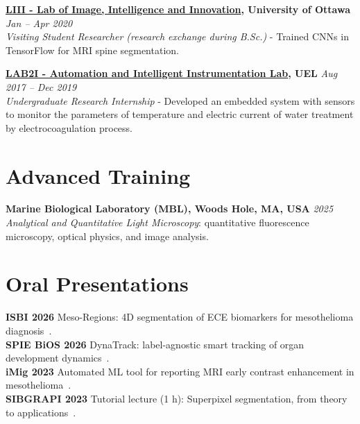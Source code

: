 \documentclass[margin,line]{resume}
\begin{document}
\begin{resume}
        \textbf{\href{https://sites.google.com/view/labiii/members/current?authuser=0}{LIII - Lab of Image, Intelligence and Innovation}, University of Ottawa} \hfill \textsl{Jan -- Apr 2020}\\
         \textit{Visiting Student Researcher (research exchange during B.Sc.)} - Trained CNNs in TensorFlow for MRI spine segmentation.
        \vspace{-0.3cm}

        \textbf{\href{https://www.linkedin.com/company/la2i---laborat-rio-de-automa-o-e-instrumenta-o-inteligente/}{LAB2I - Automation and Intelligent Instrumentation Lab}, UEL}  \hfill \textsl{Aug 2017 -- Dec 2019}\\
         \textit{Undergraduate Research Internship} - Developed an embedded system with sensors to monitor the parameters of temperature and electric current of water treatment by electrocoagulation process.

    \section{\mysidestyle Advanced Training}
    
    \textbf{Marine Biological Laboratory (MBL), Woods Hole, MA, USA} \hfill \textsl{2025}\\
    \textit{Analytical and Quantitative Light Microscopy}: quantitative fluorescence microscopy, optical physics, and image analysis.
     \vspace{-0.3cm}
      \section{\mysidestyle Oral Presentations}
        \textbf{ISBI 2026} Meso-Regions: 4D segmentation of ECE biomarkers for mesothelioma diagnosis~\cite{11515662}.\\
        \textbf{SPIE BiOS 2026} DynaTrack: label-agnostic smart tracking of organ development dynamics~\cite{theodoro2026dynatrack}.\\
        \textbf{iMig 2023} Automated ML tool for reporting MRI early contrast enhancement in mesothelioma~\cite{ARMATO2024107832}.\\
        \textbf{SIBGRAPI 2023} Tutorial lecture (1 h): Superpixel segmentation, from theory to applications~\cite{9643120}.
     \vspace{-0.3cm}

\end{resume}
\end{document}
